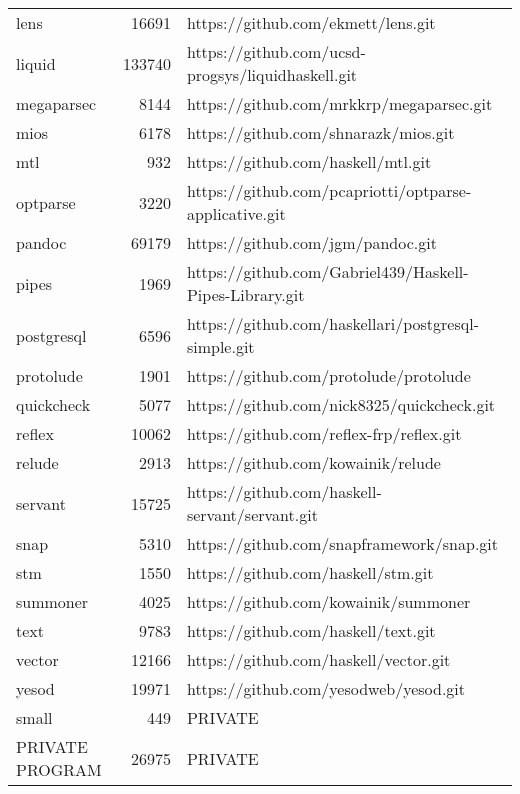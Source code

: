 \documentclass[12pt, a4paper]{article}
\begin{document}
\begin{longtable}[H]{l r l}
        lens & 16691 & https://github.com/ekmett/lens.git \\
        liquid & 133740 & https://github.com/ucsd-progsys/liquidhaskell.git \\
        megaparsec & 8144 & https://github.com/mrkkrp/megaparsec.git \\
        mios & 6178 & https://github.com/shnarazk/mios.git \\
        mtl & 932 & https://github.com/haskell/mtl.git \\
        optparse & 3220 & https://github.com/pcapriotti/optparse-applicative.git \\
        pandoc & 69179 & https://github.com/jgm/pandoc.git \\
        pipes & 1969 & https://github.com/Gabriel439/Haskell-Pipes-Library.git \\
        postgresql & 6596 & https://github.com/haskellari/postgresql-simple.git \\
        protolude & 1901 & https://github.com/protolude/protolude \\
        quickcheck & 5077 & https://github.com/nick8325/quickcheck.git \\
        reflex & 10062 & https://github.com/reflex-frp/reflex.git \\
        relude & 2913 & https://github.com/kowainik/relude \\
        servant & 15725 & https://github.com/haskell-servant/servant.git \\
        snap & 5310 & https://github.com/snapframework/snap.git \\
        stm & 1550 & https://github.com/haskell/stm.git \\
        summoner & 4025 & https://github.com/kowainik/summoner \\
        text & 9783 & https://github.com/haskell/text.git \\
        vector & 12166 & https://github.com/haskell/vector.git \\
        yesod & 19971 & https://github.com/yesodweb/yesod.git \\
        small & 449 & PRIVATE \\
        PRIVATE PROGRAM & 26975 & PRIVATE \\
    
\end{longtable}
\end{document}
